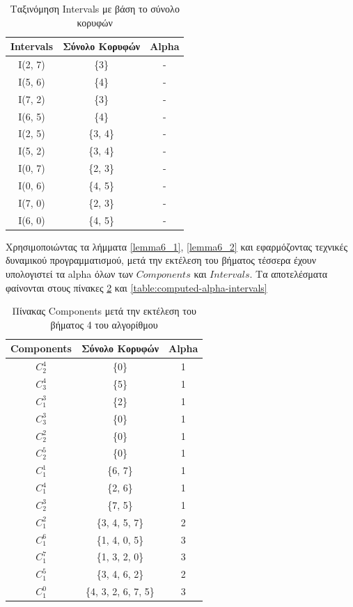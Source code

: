 \begin{table}[H]
	\centering
	\caption{Ταξινόμηση Intervals με βάση το σύνολο κορυφών}
	\begin{tabular}{|c|c|c|}
		\hline
		\textbf{Intervals} & \textbf{Σύνολο Κορυφών} & \textbf{Alpha} \\
		\hline
		I(2, 7) & \{3\} & - \\
		I(5, 6) & \{4\} & - \\
		I(7, 2) & \{3\} & - \\
		I(6, 5) & \{4\} & - \\
		I(2, 5) & \{3, 4\} & - \\
		I(5, 2) & \{3, 4\} & - \\
		I(0, 7) & \{2, 3\} & - \\
		I(0, 6) & \{4, 5\} & - \\
		I(7, 0) & \{2, 3\} & - \\
		I(6, 0) & \{4, 5\} & - \\
		\hline
	\end{tabular}
	\label{table:sorted-intervals}
\end{table}

Χρησιμοποιώντας τα λήμματα \ref{lemma6_1}, \ref{lemma6_2} και εφαρμόζοντας τεχνικές δυναμικού προγραμματισμού, μετά την εκτέλεση του βήματος τέσσερα έχουν υπολογιστεί τα alpha όλων των $Components$ και $Intervals$. Τα αποτελέσματα φαίνονται στους πίνακες \ref{table:computed-alpha-componentes}  και \ref{table:computed-alpha-intervals}

\begin{table}[H]
	\centering
	\caption{Πίνακας Components μετά την εκτέλεση του βήματος 4 του αλγορίθμου}
	\begin{tabular}{|c|c|c|}
		\hline
		\textbf{Components} & \textbf{Σύνολο Κορυφών} & \textbf{Alpha} \\
		\hline
		$C_2^4$ & \quad \{0\} & 1 \\
		$C_3^4$ & \quad \{5\} & 1 \\
		$C_1^3$ & \quad \{2\} & 1 \\
		$C_3^3$ & \quad \{0\} & 1 \\
		$C_2^2$ & \quad \{0\} & 1 \\
		$C_2^5$ & \quad \{0\} & 1 \\
		$C_1^1$ & \quad \{6, 7\} & 1 \\
		$C_1^4$ & \quad \{2, 6\} & 1 \\
		$C_2^3$ & \quad \{7, 5\} & 1 \\
		$C_1^2$ & \quad \{3, 4, 5, 7\} & 2 \\
		$C_1^6$ & \quad \{1, 4, 0, 5\} & 3 \\
		$C_1^7$ & \quad \{1, 3, 2, 0\} & 3 \\
		$C_1^5$ & \quad \{3, 4, 6, 2\} & 2 \\
		$C_1^0$ & \quad \{4, 3, 2, 6, 7, 5\} & 3 \\
		\hline
	\end{tabular}
	\label{table:computed-alpha-componentes}
\end{table} 

